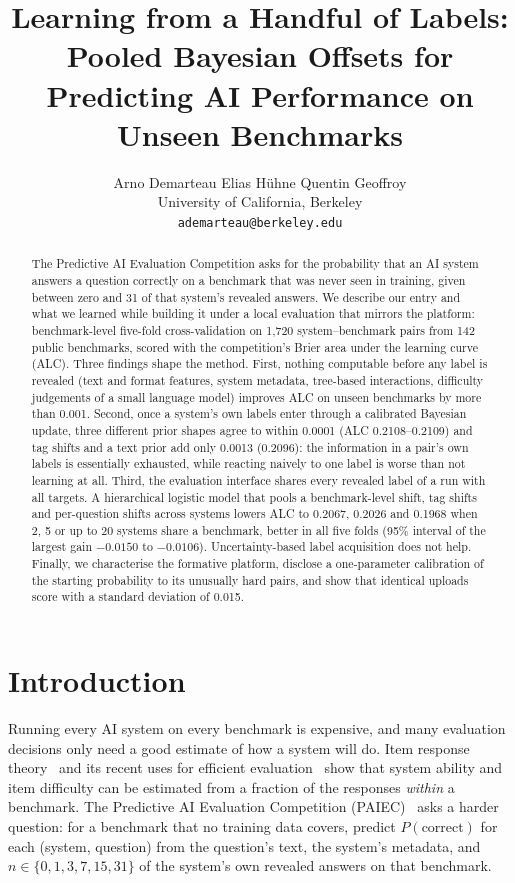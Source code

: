 \documentclass{article}
\title{Learning from a Handful of Labels: Pooled Bayesian Offsets for Predicting AI Performance on Unseen Benchmarks}
\author{%
  Arno Demarteau \qquad Elias H\"uhne \qquad Quentin Geoffroy \\
  University of California, Berkeley \\
  \texttt{ademarteau@berkeley.edu}
}
\begin{document}
\maketitle

\begin{abstract}
The Predictive AI Evaluation Competition asks for the probability that an AI system answers a question correctly on a benchmark that was never seen in training, given between zero and 31 of that system's revealed answers. We describe our entry and what we learned while building it under a local evaluation that mirrors the platform: benchmark-level five-fold cross-validation on 1{,}720 system--benchmark pairs from 142 public benchmarks, scored with the competition's Brier area under the learning curve (ALC). Three findings shape the method. First, nothing computable before any label is revealed (text and format features, system metadata, tree-based interactions, difficulty judgements of a small language model) improves ALC on unseen benchmarks by more than 0.001. Second, once a system's own labels enter through a calibrated Bayesian update, three different prior shapes agree to within 0.0001 (ALC 0.2108--0.2109) and tag shifts and a text prior add only 0.0013 (0.2096): the information in a pair's own labels is essentially exhausted, while reacting naively to one label is worse than not learning at all. Third, the evaluation interface shares every revealed label of a run with all targets. A hierarchical logistic model that pools a benchmark-level shift, tag shifts and per-question shifts across systems lowers ALC to 0.2067, 0.2026 and 0.1968 when 2, 5 or up to 20 systems share a benchmark, better in all five folds (95\% interval of the largest gain $-0.0150$ to $-0.0106$). Uncertainty-based label acquisition does not help. Finally, we characterise the formative platform, disclose a one-parameter calibration of the starting probability to its unusually hard pairs, and show that identical uploads score with a standard deviation of 0.015.
\end{abstract}

\section{Introduction}
\label{sec:intro}

Running every AI system on every benchmark is expensive, and many evaluation decisions only need a good estimate of how a system will do. Item response theory~\citep{rasch1960,lord1980,lalor2016} and its recent uses for efficient evaluation~\citep{rodriguez2021,polo2024} show that system ability and item difficulty can be estimated from a fraction of the responses \emph{within} a benchmark. The Predictive AI Evaluation Competition (PAIEC)~\citep{paiec2026} asks a harder question: for a benchmark that no training data covers, predict $P(\text{correct})$ for each (system, question) from the question's text, the system's metadata, and $n \in \{0,1,3,7,15,31\}$ of the system's own revealed answers on that benchmark.
\end{document}
